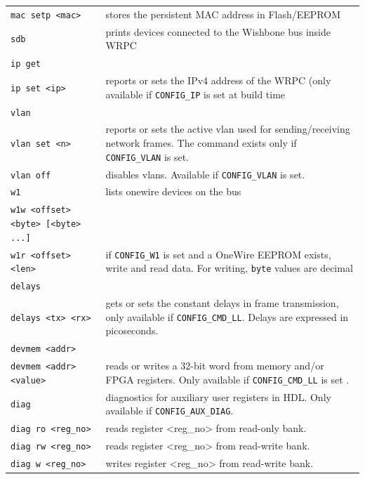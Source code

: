 \documentclass[a4paper, 12pt]{article}
\newcommand{\code}[1]{\texttt{#1}}
\begin{document}
\begin{longtable}{  p{7.5cm}  p{7cm} }
  \code{mac setp <mac>} & stores the persistent MAC address in Flash/EEPROM\\

  \code{sdb} & prints devices connected to the Wishbone bus inside WRPC\\

  \code{ip get} & \\

  \code{ip set <ip>} & reports or sets the IPv4 address of the WRPC (only available if \texttt{CONFIG\_IP} is set at build time\\

  \code{vlan} & \\

  \code{vlan set <n>} & reports or sets the active vlan used for sending/receiving network frames. The command exists only if \texttt{CONFIG\_VLAN} is set.\\
  \code{vlan off} & disables vlans. Available if \texttt{CONFIG\_VLAN} is set.\\

  \code{w1} & lists onewire devices on the bus\\

  \code{w1w <offset> <byte> [<byte> ...]}& \\

  \code{w1r <offset> <len>} & if \texttt{CONFIG\_W1} is set and a OneWire EEPROM exists, write and read data. For writing, \texttt{byte} values are decimal\\

  \code{delays}&\\

  \code{delays <tx> <rx>} & gets or sets the constant delays in frame transmission, only available if \texttt{CONFIG\_CMD\_LL}. Delays are expressed in picoseconds.\\

  \code{devmem <addr>} & \\

  \code{devmem <addr> <value>} & reads or writes a 32-bit word from memory and/or FPGA registers. Only available if \texttt{CONFIG\_CMD\_LL} is set .\\

  \code{diag} & diagnostics for auxiliary user registers in HDL. Only available if \texttt{CONFIG\_AUX\_DIAG}.\\
  \code{diag ro <reg\_no>} & reads register <reg\_no> from read-only bank.\\
  \code{diag rw <reg\_no>} & reads register <reg\_no> from read-write bank.\\
  \code{diag w <reg\_no>} & writes register <reg\_no> from read-write bank.\\


\end{longtable}
\end{document}
